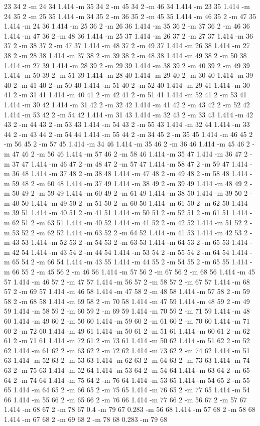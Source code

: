 \documentclass[12pt]{article}
\begin{document}
23 34 2 -m 24 34 1.414 -m 35 34 2 -m 45 34 2 -m 46 34 1.414 -m 23 35 1.414 -m 24 35 2 -m 25 35 1.414 -m 34 35 2 -m 36 35 2 -m 45 35 1.414 -m 46 35 2 -m 47 35 1.414 -m 24 36 1.414 -m 25 36 2 -m 26 36 1.414 -m 35 36 2 -m 37 36 2 -m 46 36 1.414 -m 47 36 2 -m 48 36 1.414 -m 25 37 1.414 -m 26 37 2 -m 27 37 1.414 -m 36 37 2 -m 38 37 2 -m 47 37 1.414 -m 48 37 2 -m 49 37 1.414 -m 26 38 1.414 -m 27 38 2 -m 28 38 1.414 -m 37 38 2 -m 39 38 2 -m 48 38 1.414 -m 49 38 2 -m 50 38 1.414 -m 27 39 1.414 -m 28 39 2 -m 29 39 1.414 -m 38 39 2 -m 40 39 2 -m 49 39 1.414 -m 50 39 2 -m 51 39 1.414 -m 28 40 1.414 -m 29 40 2 -m 30 40 1.414 -m 39 40 2 -m 41 40 2 -m 50 40 1.414 -m 51 40 2 -m 52 40 1.414 -m 29 41 1.414 -m 30 41 2 -m 31 41 1.414 -m 40 41 2 -m 42 41 2 -m 51 41 1.414 -m 52 41 2 -m 53 41 1.414 -m 30 42 1.414 -m 31 42 2 -m 32 42 1.414 -m 41 42 2 -m 43 42 2 -m 52 42 1.414 -m 53 42 2 -m 54 42 1.414 -m 31 43 1.414 -m 32 43 2 -m 33 43 1.414 -m 42 43 2 -m 44 43 2 -m 53 43 1.414 -m 54 43 2 -m 55 43 1.414 -m 32 44 1.414 -m 33 44 2 -m 43 44 2 -m 54 44 1.414 -m 55 44 2 -m 34 45 2 -m 35 45 1.414 -m 46 45 2 -m 56 45 2 -m 57 45 1.414 -m 34 46 1.414 -m 35 46 2 -m 36 46 1.414 -m 45 46 2 -m 47 46 2 -m 56 46 1.414 -m 57 46 2 -m 58 46 1.414 -m 35 47 1.414 -m 36 47 2 -m 37 47 1.414 -m 46 47 2 -m 48 47 2 -m 57 47 1.414 -m 58 47 2 -m 59 47 1.414 -m 36 48 1.414 -m 37 48 2 -m 38 48 1.414 -m 47 48 2 -m 49 48 2 -m 58 48 1.414 -m 59 48 2 -m 60 48 1.414 -m 37 49 1.414 -m 38 49 2 -m 39 49 1.414 -m 48 49 2 -m 50 49 2 -m 59 49 1.414 -m 60 49 2 -m 61 49 1.414 -m 38 50 1.414 -m 39 50 2 -m 40 50 1.414 -m 49 50 2 -m 51 50 2 -m 60 50 1.414 -m 61 50 2 -m 62 50 1.414 -m 39 51 1.414 -m 40 51 2 -m 41 51 1.414 -m 50 51 2 -m 52 51 2 -m 61 51 1.414 -m 62 51 2 -m 63 51 1.414 -m 40 52 1.414 -m 41 52 2 -m 42 52 1.414 -m 51 52 2 -m 53 52 2 -m 62 52 1.414 -m 63 52 2 -m 64 52 1.414 -m 41 53 1.414 -m 42 53 2 -m 43 53 1.414 -m 52 53 2 -m 54 53 2 -m 63 53 1.414 -m 64 53 2 -m 65 53 1.414 -m 42 54 1.414 -m 43 54 2 -m 44 54 1.414 -m 53 54 2 -m 55 54 2 -m 64 54 1.414 -m 65 54 2 -m 66 54 1.414 -m 43 55 1.414 -m 44 55 2 -m 54 55 2 -m 65 55 1.414 -m 66 55 2 -m 45 56 2 -m 46 56 1.414 -m 57 56 2 -m 67 56 2 -m 68 56 1.414 -m 45 57 1.414 -m 46 57 2 -m 47 57 1.414 -m 56 57 2 -m 58 57 2 -m 67 57 1.414 -m 68 57 2 -m 69 57 1.414 -m 46 58 1.414 -m 47 58 2 -m 48 58 1.414 -m 57 58 2 -m 59 58 2 -m 68 58 1.414 -m 69 58 2 -m 70 58 1.414 -m 47 59 1.414 -m 48 59 2 -m 49 59 1.414 -m 58 59 2 -m 60 59 2 -m 69 59 1.414 -m 70 59 2 -m 71 59 1.414 -m 48 60 1.414 -m 49 60 2 -m 50 60 1.414 -m 59 60 2 -m 61 60 2 -m 70 60 1.414 -m 71 60 2 -m 72 60 1.414 -m 49 61 1.414 -m 50 61 2 -m 51 61 1.414 -m 60 61 2 -m 62 61 2 -m 71 61 1.414 -m 72 61 2 -m 73 61 1.414 -m 50 62 1.414 -m 51 62 2 -m 52 62 1.414 -m 61 62 2 -m 63 62 2 -m 72 62 1.414 -m 73 62 2 -m 74 62 1.414 -m 51 63 1.414 -m 52 63 2 -m 53 63 1.414 -m 62 63 2 -m 64 63 2 -m 73 63 1.414 -m 74 63 2 -m 75 63 1.414 -m 52 64 1.414 -m 53 64 2 -m 54 64 1.414 -m 63 64 2 -m 65 64 2 -m 74 64 1.414 -m 75 64 2 -m 76 64 1.414 -m 53 65 1.414 -m 54 65 2 -m 55 65 1.414 -m 64 65 2 -m 66 65 2 -m 75 65 1.414 -m 76 65 2 -m 77 65 1.414 -m 54 66 1.414 -m 55 66 2 -m 65 66 2 -m 76 66 1.414 -m 77 66 2 -m 56 67 2 -m 57 67 1.414 -m 68 67 2 -m 78 67 0.4 -m 79 67 0.283 -m 56 68 1.414 -m 57 68 2 -m 58 68 1.414 -m 67 68 2 -m 69 68 2 -m 78 68 0.283 -m 79 68 
\end{document}
